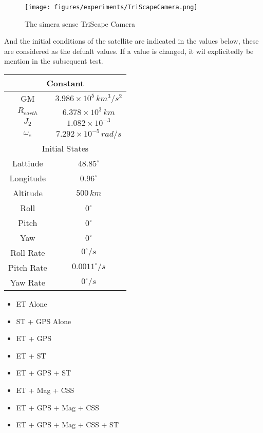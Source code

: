 \begin{figure}[H]
    \centering
    \texttt{[image: figures/experiments/TriScapeCamera.png]}
    \caption{The simera sense TriScape Camera}
    \label{fig:TSC}
\end{figure}


And the initial conditions of the satellite are indicated in the values below, these are considered as the defualt values. If a value is changed, it wil explicitedly be mention in the subsequent test.

\begin{table}
    \begin{center}
        \begin{tabular}{|c|c|}
        \hline
        \multicolumn{2}{|c|}{Constant} \\
        \hline
        GM          & $3.986 \times 10^5 \, km^3/s^2$ \\
        $R_{earth}$ & $6.378 \times 10^3 \, km$ \\
        $J_2$       & $1.082 \times 10^{-3}$ \\
        $\omega_e$  & $7.292 \times 10^{-5} \, rad/s$ \\
        \hline
        \multicolumn{2}{|c|}{Initial States} \\
        \hline
        Lattiude    & $48.85^{\circ}$ \\
        Longitude   & $0.96^{\circ}$ \\
        Altitude    & $500 \, km$ \\
        Roll        & $0^{\circ}$ \\
        Pitch       & $0^{\circ}$ \\
        Yaw         & $0^{\circ}$ \\
        Roll Rate   & $0^{\circ}/s$ \\
        Pitch Rate  & $0.0011^{\circ}/s$ \\
        Yaw Rate    & $0^{\circ}/s$ \\
        \end{tabular}
    \end{center}
\end{table}




\label{sec:SensorTest}

\begin{itemize}
    \item ET Alone
    \item ST + GPS Alone
    \item ET + GPS
    \item ET + ST
    \item ET + GPS + ST
    \item ET + Mag + CSS
    \item ET + GPS + Mag + CSS
    \item ET + GPS + Mag + CSS + ST 
\end{itemize}

